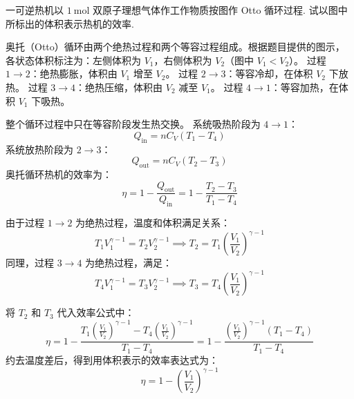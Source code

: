 \begin{exercise}\label{ex:11.10}
一可逆热机以 $1 \ \mathrm{mol}$ 双原子理想气体作工作物质按图作 Otto 循环过程. 试以图中所标出的体积表示热机的效率.
\begin{center}
\end{center}
\end{exercise}
\begin{solution}
奥托（Otto）循环由两个绝热过程和两个等容过程组成。根据题目提供的图示，各状态体积标注为：左侧体积为 $V_1$，右侧体积为 $V_2$（图中 $V_1 < V_2$）。
过程 $1 \to 2$：绝热膨胀，体积由 $V_1$ 增至 $V_2$。
过程 $2 \to 3$：等容冷却，在体积 $V_2$ 下放热。
过程 $3 \to 4$：绝热压缩，体积由 $V_2$ 减至 $V_1$。
过程 $4 \to 1$：等容加热，在体积 $V_1$ 下吸热。

整个循环过程中只在等容阶段发生热交换。
系统吸热阶段为 $4 \to 1$：
$$ Q_{\text{in}} = n C_V (T_1 - T_4) $$
系统放热阶段为 $2 \to 3$：
$$ Q_{\text{out}} = n C_V (T_2 - T_3) $$
奥托循环热机的效率为：
$$ \eta = 1 - \frac{Q_{\text{out}}}{Q_{\text{in}}} = 1 - \frac{T_2 - T_3}{T_1 - T_4} $$

由于过程 $1 \to 2$ 为绝热过程，温度和体积满足关系：
$$ T_1 V_1^{\gamma-1} = T_2 V_2^{\gamma-1} \implies T_2 = T_1 \left( \frac{V_1}{V_2} \right)^{\gamma-1} $$
同理，过程 $3 \to 4$ 为绝热过程，满足：
$$ T_4 V_1^{\gamma-1} = T_3 V_2^{\gamma-1} \implies T_3 = T_4 \left( \frac{V_1}{V_2} \right)^{\gamma-1} $$

将 $T_2$ 和 $T_3$ 代入效率公式中：
$$ \eta = 1 - \frac{T_1 \left( \frac{V_1}{V_2} \right)^{\gamma-1} - T_4 \left( \frac{V_1}{V_2} \right)^{\gamma-1}}{T_1 - T_4} = 1 - \frac{\left( \frac{V_1}{V_2} \right)^{\gamma-1} (T_1 - T_4)}{T_1 - T_4} $$
约去温度差后，得到用体积表示的效率表达式为：
$$ \eta = 1 - \left( \frac{V_1}{V_2} \right)^{\gamma-1} $$
\end{solution}

